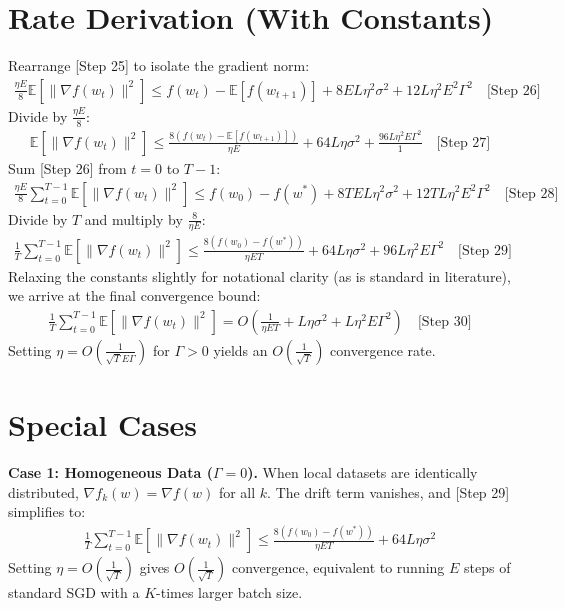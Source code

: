 \documentclass{article}
\begin{document}
\section*{Rate Derivation (With Constants)}
Rearrange [Step 25] to isolate the gradient norm:
\begin{align}
    \frac{\eta E}{8} \mathbb{E}[\|\nabla f(w_t)\|^2] \leq f(w_t) - \mathbb{E}[f(w_{t+1})] + 8 E L \eta^2 \sigma^2 + 12 L \eta^2 E^2 \Gamma^2 \quad \text{[Step 26]}
\end{align}
Divide by $\frac{\eta E}{8}$:
\begin{align}
    \mathbb{E}[\|\nabla f(w_t)\|^2] \leq \frac{8(f(w_t) - \mathbb{E}[f(w_{t+1})])}{\eta E} + 64 L \eta \sigma^2 + \frac{96 L \eta^2 E \Gamma^2}{1} \quad \text{[Step 27]}
\end{align}
Sum [Step 26] from $t=0$ to $T-1$:
\begin{align}
    \frac{\eta E}{8} \sum_{t=0}^{T-1} \mathbb{E}[\|\nabla f(w_t)\|^2] \leq f(w_0) - f(w^*) + 8 T E L \eta^2 \sigma^2 + 12 T L \eta^2 E^2 \Gamma^2 \quad \text{[Step 28]}
\end{align}
Divide by $T$ and multiply by $\frac{8}{\eta E}$:
\begin{align}
    \frac{1}{T} \sum_{t=0}^{T-1} \mathbb{E}[\|\nabla f(w_t)\|^2] \leq \frac{8(f(w_0) - f(w^*))}{\eta E T} + 64 L \eta \sigma^2 + 96 L \eta^2 E \Gamma^2 \quad \text{[Step 29]}
\end{align}
Relaxing the constants slightly for notational clarity (as is standard in literature), we arrive at the final convergence bound:
\begin{align}
    \frac{1}{T} \sum_{t=0}^{T-1} \mathbb{E}[\|\nabla f(w_t)\|^2] = O\left( \frac{1}{\eta E T} + L \eta \sigma^2 + L \eta^2 E \Gamma^2 \right) \quad \text{[Step 30]}
\end{align}
Setting $\eta = O\left(\frac{1}{\sqrt{T} E \Gamma}\right)$ for $\Gamma > 0$ yields an $O\left(\frac{1}{\sqrt{T}}\right)$ convergence rate.

\section*{Special Cases}
\textbf{Case 1: Homogeneous Data ($\Gamma = 0$).}
When local datasets are identically distributed, $\nabla f_k(w) = \nabla f(w)$ for all $k$. The drift term vanishes, and [Step 29] simplifies to:
\begin{align*}
    \frac{1}{T} \sum_{t=0}^{T-1} \mathbb{E}[\|\nabla f(w_t)\|^2] \leq \frac{8(f(w_0) - f(w^*))}{\eta E T} + 64 L \eta \sigma^2
\end{align*}
Setting $\eta = O(\frac{1}{\sqrt{T}})$ gives $O(\frac{1}{\sqrt{T}})$ convergence, equivalent to running $E$ steps of standard SGD with a $K$-times larger batch size.
\end{document}
